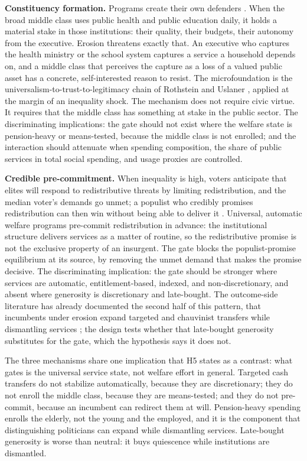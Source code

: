 \documentclass[11pt,letterpaper]{article}
\begin{document}
\textbf{Constituency formation.} Programs create their own defenders \citep{Pierson1993, SossSchram2007}. When the broad middle class uses public health and public education daily, it holds a material stake in those institutions: their quality, their budgets, their autonomy from the executive. Erosion threatens exactly that. An executive who captures the health ministry or the school system captures a service a household depends on, and a middle class that perceives the capture as a loss of a valued public asset has a concrete, self-interested reason to resist. The microfoundation is the universalism-to-trust-to-legitimacy chain of Rothstein and Uslaner \citep{RothsteinUslaner2005}, applied at the margin of an inequality shock. The mechanism does not require civic virtue. It requires that the middle class has something at stake in the public sector. The discriminating implications: the gate should not exist where the welfare state is pension-heavy or means-tested, because the middle class is not enrolled; and the interaction should attenuate when spending composition, the share of public services in total social spending, and usage proxies are controlled.

\textbf{Credible pre-commitment.} When inequality is high, voters anticipate that elites will respond to redistributive threats by limiting redistribution, and the median voter's demands go unmet; a populist who credibly promises redistribution can then win without being able to deliver it \citep{AcemogluEgorov2013}. Universal, automatic welfare programs pre-commit redistribution in advance: the institutional structure delivers services as a matter of routine, so the redistributive promise is not the exclusive property of an insurgent. The gate blocks the populist-promise equilibrium at its source, by removing the unmet demand that makes the promise decisive. The discriminating implication: the gate should be stronger where services are automatic, entitlement-based, indexed, and non-discretionary, and absent where generosity is discretionary and late-bought. The outcome-side literature has already documented the second half of this pattern, that incumbents under erosion expand targeted and chauvinist transfers while dismantling services \citep{SzikraOktem2023, LendvaiBainton2021, Vanhuysse2006, Benczes2024, EnnserJedenastik2018}; the design tests whether that late-bought generosity substitutes for the gate, which the hypothesis says it does not.

The three mechanisms share one implication that H5 states as a contrast: what gates is the universal service state, not welfare effort in general. Targeted cash transfers do not stabilize automatically, because they are discretionary; they do not enroll the middle class, because they are means-tested; and they do not pre-commit, because an incumbent can redirect them at will. Pension-heavy spending enrolls the elderly, not the young and the employed, and it is the component that distinguishing politicians can expand while dismantling services. Late-bought generosity is worse than neutral: it buys quiescence while institutions are dismantled.
\end{document}
